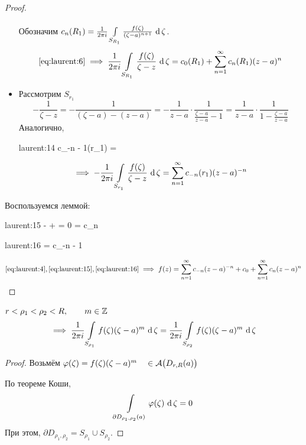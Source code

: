\begin{proof}
\begin{itemize}
\begin{multline}
			\end{multline}
			Обозначим $ c_n(R_1) = \frac1{2\pi i}\cint[\zeta]{S_{R_1}}{\frac{f(\zeta)}{(\zeta - a)^{n + 1}}} $.
			$$ \eref{laurent:6} \implies \frac1{2\pi i} \cint[\zeta]{S_{R_1}}{\frac{f(\zeta)}{\zeta - z}} = c_0(R_1) + \sum_{n = 1}^\infty c_n(R_1)(z - a)^n $$
		\item Рассмотрим $ S_{r_1} $
			$$ -\frac1{\zeta - z} = -\frac1{(\zeta - a) - (z - a)} = -\frac1{z - a} \cdot \frac1{\frac{\zeta - a}{z - a} - 1} = \frac1{z - a} \cdot \frac1{1 - \frac{\zeta - a}{z - a}} $$
			Аналогично,
			\begin{equ}{laurent:14}
				c_{-n - 1}(r_1) =  
			\end{equ}
			$$ \implies -\frac1{2\pi i}\cint[\zeta]{S_{r_1}}{\frac{f(\zeta)}{\zeta - z}} = \sum_{n = 1}^\infty c_{-n}(r_1) (z - a)^{-n} $$
	\end{itemize}

	Воспользуемся леммой:
	\begin{equ}{laurent:15}
		\iff - +  = 0 \iff {} =   \bydef c_n
	\end{equ}
	\begin{equ}{laurent:16}
		  =  \bydef c_{-n - 1}
	\end{equ}
	$$ \eref{laurent:4}, \eref{laurent:15}, \eref{laurent:16} \implies f(z) = \sum_{n = 1}^\infty c_{-n}(z - a)^{-n} + c_0 + \sum_{n = 1}^\infty c_n(z - a)^n $$
\end{proof}

\begin{lemma}
	$ r < \rho_1 < \rho_2 < R, \qquad m \in \Z $
	$$ \implies \frac1{2\pi i} \cint[\zeta]{S_{\rho_1}}{f(\zeta)(\zeta - a)^m} = \frac1{2\pi i}\cint[\zeta]{S_{\rho_2}}{f(\zeta)(\zeta - a)^m} $$
\end{lemma}

\begin{proof}
	Возьмём $ \vphi(\zeta) = f(\zeta)(\zeta - a)^m \quad \in \mathcal A \big( D_{r, R}(a) \big) $

	По теореме Коши,
	$$ \cint[\zeta]{\partial D_{\rho_1, \rho_2}(a)}{\vphi(\zeta)} = 0 $$
	При этом, $ \partial D_{\rho_1, \rho_2} = S_{\rho_1} \cup S_{\rho_2} $.
\end{proof}

